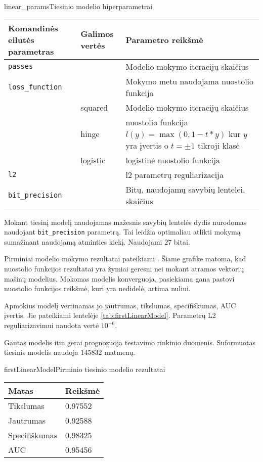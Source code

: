 \begin{ktutable}{linear_params}{Tiesinio modelio hiperparametrai}
    \begin{tabular}{| l | l | p{7cm}|}
    \hline
        Komandinės eilutės parametras & Galimos vertės & Parametro reikšmė\\ \hline
        \texttt{passes} &  & Modelio mokymo iteracijų skaičius \\ \hline
        \texttt{loss\_function} &          & Mokymo metu naudojama nuostolio funkcija \\
                               & squared  & Modelio mokymo iteracijų skaičius \\
                               & hinge    & nuostolio funkcija $l(y) = \max(0, 1 - t * y)$ kur $y$ yra įvertis o $t = \pm 1$ tikroji klasė  \\
                               & logistic & logistinė nuostolio funkcija \\ \hline
        \texttt{l2} & & l2 parametrų reguliarizacija \\ \hline
        \texttt{bit\_precision} & & Bitų, naudojamų savybių lentelei, skaičius\\ \hline
    \end{tabular}
\end{ktutable}

Mokant tiesinį modelį naudojamas mažesnis savybių lentelės dydis nurodomas naudojant \texttt{bit\_precision}
 parametrą. Tai leidžia optimaliau atlikti mokymą sumažinant naudojamą atminties kiekį. Naudojami $27$ bitai.

Pirminiai modelio mokymo rezultatai pateikiami . Šiame grafike
matoma, kad nuostolio funkcijos rezultatai yra žymiai geresni nei mokant atramos vektorių mašinų
modelius. Mokomas modelis konverguoja, pasiekiama gana pastovi nuostolio funkcijos reikšmė, kuri
yra nedidelė, artima nuliui.


Apmokius modelį vertinamas jo jautrumas, tikslumas, specifiškumas, AUC įvertis. Jie pateikiami
lentelėje \vref{tab:firstLinearModel}. Parametrų L2 reguliarizavimui naudota vertė $10^{-6}$.

Gautas modelis itin gerai prognozuoja testavimo rinkinio duomenis. Suformuotas tiesinis modelis naudoja
$145832$ matmenų.

\begin{ktutable}{firstLinearModel}{Pirminio tiesinio modelio rezultatai}
    \begin{tabular}{| l | l |}
    \hline
       Matas & Reikšmė \\ \hline
               Tikslumas & 0.97552 \\ \hline
               Jautrumas & 0.92588 \\ \hline
               Specifiškumas & 0.98325 \\ \hline
               AUC & 0.95456 \\ \hline
    \end{tabular}
\end{ktutable}

